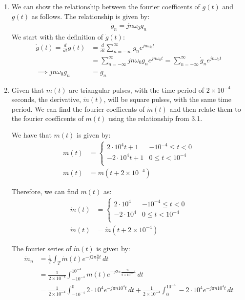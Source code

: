 \documentclass{article}
\begin{document}
\begin{enumerate}[label=3.\arabic*]
    \item We can show the relationship between the fourier coefficents of $g(t)$ and $\dot{g}(t)$ as follows. The relationship is given by:
    \begin{align*}
        \dot{g}_n = jn\omega_0 g_n
    \end{align*}
    We start with the definition of $\dot{g}(t)$:
    \begin{align*}
        \dot{g}(t) = \frac{d}{dt} g(t) &= \frac{d}{dt} \sum_{n=-\infty}^{\infty} g_n e^{jn\omega_0 t} \\
        &= \sum_{n=-\infty}^{\infty} jn\omega_0 g_n e^{jn\omega_0 t} = \sum_{n=-\infty}^{\infty} \dot{g}_n e^{jn\omega_0 t} \\
        \implies jn\omega_0 g_n &= \dot{g}_n
    \end{align*}

    \item Given that $m(t)$ are triangular pulses, with the time period of $2\times10^{-4}$ seconds, the derivative, $\dot{m}(t)$, will be square pulses, with the same time period. We can find the fourier coefficents of $\dot{m}(t)$ and then relate them to the fourier coefficents of $m(t)$ using the relationship from 3.1.
    
    We have that $m(t)$ is given by:
    \begin{align*}
        m(t) &= \begin{cases}
            2\cdot10^4t + 1 & -10^{-4} \leq t < 0 \\
            -2\cdot10^4t + 1 & 0 \leq t < 10^{-4} \\
        \end{cases} \\
        m(t) &= m(t+2\times10^{-4})
    \end{align*}

    Therefore, we can find $\dot{m}(t)$ as:
    \begin{align*}
        \dot{m}(t) &= \begin{cases}
            2\cdot10^4 & -10^{-4} \leq t < 0 \\
            -2\cdot10^4 & 0 \leq t < 10^{-4} \\
        \end{cases} \\
        \dot{m}(t) &= \dot{m}(t+2\times10^{-4})
    \end{align*}

    The fourier series of $\dot{m}(t)$ is given by:
    \begin{align*}
        \dot{m}_n &= \frac{1}{T} \int_{T} \dot{m}(t) e^{-j2\pi \frac{n}{T} t} \, dt \\
        &= \frac{1}{2\times10^{-4}} \int_{-10^{-4}}^{10^{-4}} \dot{m}(t) e^{-j2\pi \frac{n}{2\times10^{-4}} t} \, dt \\
        &= \frac{1}{2\times 10^{-4}} \int_{-10^{-4}}^{0} 2\cdot10^4 e^{-j\pi n10^{4} t} \, dt + \frac{1}{2\times 10^{-4}} \int_{0}^{10^{-4}} -2\cdot10^4 e^{-j\pi n10^{4}t} \, dt \\
    \end{align*}


\end{enumerate}
\end{document}

